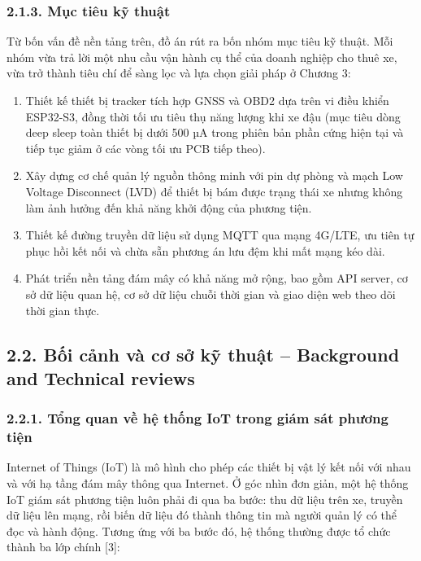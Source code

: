\documentclass[a4paper]{extarticle}
\providecommand{\tightlist}{%
  \setlength{\itemsep}{0pt}\setlength{\parskip}{0pt}}
\begin{document}
\subsubsection{2.1.3. Mục tiêu kỹ
thuật}\label{213-mux1ee5c-tiuxeau-kux1ef9-thuux1eadt}

Từ bốn vấn đề nền tảng trên, đồ án rút ra bốn nhóm mục tiêu kỹ thuật.
Mỗi nhóm vừa trả lời một nhu cầu vận hành cụ thể của doanh nghiệp cho
thuê xe, vừa trở thành tiêu chí để sàng lọc và lựa chọn giải pháp ở
Chương 3:

\begin{enumerate}
\def\labelenumi{\arabic{enumi}.}
\tightlist
\item
  Thiết kế thiết bị tracker tích hợp GNSS và OBD2 dựa trên vi điều khiển
  ESP32-S3, đồng thời tối ưu tiêu thụ năng lượng khi xe đậu
  (mục tiêu dòng deep sleep toàn thiết bị dưới 500 µA trong phiên bản
  phần cứng hiện tại và tiếp tục giảm ở các vòng tối ưu PCB tiếp theo).
\item
  Xây dựng cơ chế quản lý nguồn thông minh với pin dự phòng và mạch Low
  Voltage Disconnect (LVD) để thiết bị bám được trạng thái xe nhưng không
  làm ảnh hưởng đến khả năng khởi động của phương tiện.
\item
  Thiết kế đường truyền dữ liệu sử dụng MQTT qua mạng 4G/LTE, ưu tiên tự
  phục hồi kết nối và chừa sẵn phương án lưu đệm khi mất mạng kéo dài.
\item
  Phát triển nền tảng đám mây có khả năng mở rộng, bao gồm API server,
  cơ sở dữ liệu quan hệ, cơ sở dữ liệu chuỗi thời gian và giao diện web
  theo dõi thời gian thực.
\end{enumerate}

\subsection{2.2. Bối cảnh và cơ sở kỹ thuật -- Background and Technical
reviews}\label{22-bux1ed1i-cux1ea3nh-vuxe0-cux1a1-sux1edf-kux1ef9-thuux1eadt--background-and-technical-reviews}

\subsubsection{2.2.1. Tổng quan về hệ thống IoT trong giám sát phương
tiện}\label{221-tux1ed5ng-quan-vux1ec1-hux1ec7-thux1ed1ng-iot-trong-giuxe1m-suxe1t-phux1b0ux1a1ng-tiux1ec7n}

Internet of Things (IoT) là mô hình cho phép các thiết bị vật lý kết nối
với nhau và với hạ tầng đám mây thông qua Internet. Ở góc nhìn đơn giản,
một hệ thống IoT giám sát phương tiện luôn phải đi qua ba bước: thu dữ
liệu trên xe, truyền dữ liệu lên mạng, rồi biến dữ liệu đó thành thông
tin mà người quản lý có thể đọc và hành động. Tương ứng với ba bước đó,
hệ thống thường được tổ chức thành ba lớp chính {[}3{]}:
\end{document}
